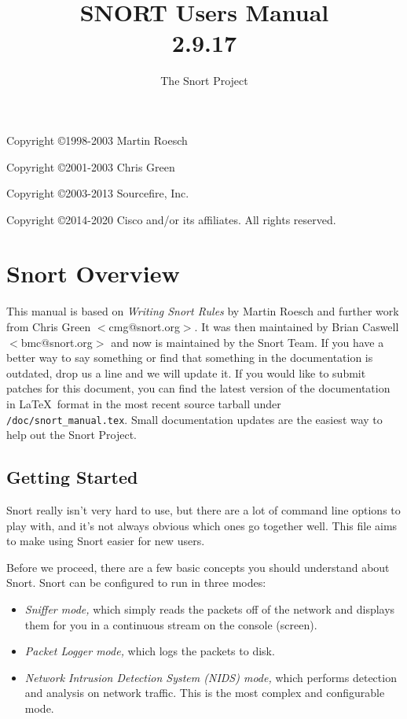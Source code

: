 \documentclass[english]{report}
\begin{document}
\title{SNORT\textsuperscript{\textregistered} Users Manual\\2.9.17}

\author{The Snort Project}

\maketitle

\newpage

Copyright \copyright 1998-2003 Martin Roesch

Copyright \copyright 2001-2003 Chris Green

Copyright \copyright 2003-2013 Sourcefire, Inc.

Copyright \copyright 2014-2020 Cisco and/or its affiliates. All rights reserved.

\tableofcontents{}

\chapter{Snort Overview}

This manual is based on \emph{Writing Snort Rules} by Martin Roesch and further
work from Chris Green $<$cmg@snort.org$>$.  It was then maintained by Brian
Caswell $<$bmc@snort.org$>$ and now is maintained by the Snort Team.  If you
have a better way to say something or find that something in the documentation
is outdated, drop us a line and we will update it.  If you would like to submit
patches for this document, you can find the latest version of the documentation
in \LaTeX\ format in the most recent source tarball under
\verb!/doc/snort_manual.tex!.  Small documentation updates are the easiest way
to help out the Snort Project.

\section{Getting Started}

Snort really isn't very hard to use, but there are a lot of command line
options to play with, and it's not always obvious which ones go together well.
This file aims to make using Snort easier for new users.

Before we proceed, there are a few basic concepts you should understand about
Snort. Snort can be configured to run in three modes:

\begin{itemize}

\item {\em Sniffer mode,} which simply reads the packets off of the network and
displays them for you in a continuous stream on the console (screen). 

\item {\em Packet Logger mode,} which logs the packets to disk. 

\item {\em Network Intrusion Detection System (NIDS) mode,} which performs
detection and analysis on network traffic. This is the most complex and
configurable mode.

\end{itemize}
\end{document}
